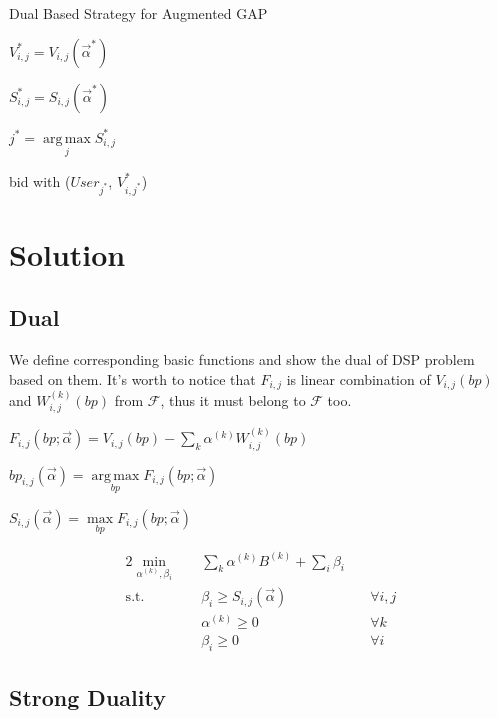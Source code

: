 \documentclass[sigconf]{acmart}
\DeclareMathOperator*{\argmax}{arg\,max}
\newcommand{\sumi}{\sum\limits_i}
\newcommand{\sumk}{\sum\limits_k}
\newcommand{\sbp}{bp_{i,j}}
\newcommand{\sV}{V_{i,j}}
\newcommand{\sW}{W_{i,j}^{(k)}}
\newcommand{\sB}{B^{(k)}}
\newcommand{\salpha}{\alpha^{(k)}}
\newcommand{\sbeta}{\beta_i}
\newcommand{\sF}{F_{i,j}}
\newcommand{\sS}{S_{i,j}}
\newcommand{\valpha}{\vec{\alpha}}
\newcommand{\uff}{\mathscr{F}}
\newcommand{\scoreconstraint}{\sbeta \ge \sS(\vec{\alpha})}
\begin{document}
\begin{algorithm}
\caption{Dual Based Strategy for Augmented GAP}

{
  {
    $\sV^* = \sV(\valpha^*)$

    $\sS^* = \sS(\valpha^*)$
  }
  $j^* = \argmax\limits_j \sS^*$
  
   { bid with ($User_{j^*}$, $V_{i,j^*}^*$) }
}
\end{algorithm}

\newpage
\section{Solution}

\subsection{Dual}

We define corresponding basic functions and show the dual of DSP problem based on them.
It's worth to notice that $\sF$ is linear combination of $\sV(bp)$ and $\sW(bp)$ from $\uff$, thus it must belong to $\uff$ too.

\begin{definition}
$\sF(bp; \valpha) = \sV(bp) - \sumk \salpha \sW(bp)$
\end{definition}

\begin{definition}
$\sbp(\valpha) = \argmax\limits_{bp} \sF(bp; \valpha)$
\end{definition}

\begin{definition}
$\sS(\valpha) = \max\limits_{bp} \sF(bp; \valpha)$
\end{definition}

\begin{alignat}{2}
    \min\limits_{\salpha, \sbeta} \quad & \sumk \salpha \sB + \sumi \sbeta \quad & {} \\
    \mbox{s.t.} \quad                   & \scoreconstraint \quad                 & \forall i,j \\
    \quad                               & \salpha \ge 0 \quad                    & \forall k \\
    \quad                               & \sbeta \ge 0 \quad                     & \forall i
\end{alignat}

\subsection{Strong Duality}
\end{document}

